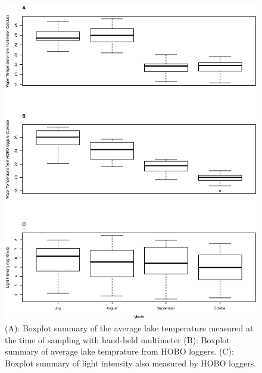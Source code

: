 \begin{center}
\begin{figure}
\includegraphics[width=\textwidth]{figures/hobo}
\caption{
(A): Boxplot summary of the average lake temperature measured at the time of sampling with hand-held multimeter 
(B): Boxplot summary of average lake temprature from HOBO loggers. 
(C): Boxplot summary of light intensity also measured by HOBO loggers.
} 
\label{fig:hobo}
\end{figure}



\end{center}
